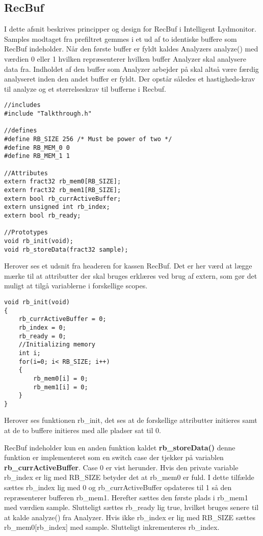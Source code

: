 \subsection{RecBuf}
I dette afsnit beskrives principper og design for RecBuf i Intelligent Lydmonitor.
Samples modtaget fra prefiltret gemmes i et ud af to identiske buffere som RecBuf indeholder. Når den første buffer er fyldt kaldes Analyzers analyze() med værdien 0 eller 1 hvilken repræsenterer hvilken buffer Analyzer skal analysere data fra. Indholdet af den buffer som Analyzer arbejder på skal altså være færdig analyseret inden den andet buffer er fyldt. Der opstår således et hastigheds-krav til analyze og et størrelseskrav til bufferne i Recbuf. 

\begin{verbatim}
//includes
#include "Talkthrough.h"

//defines
#define RB_SIZE 256 /* Must be power of two */
#define RB_MEM_0 0
#define RB_MEM_1 1

//Attributes
extern fract32 rb_mem0[RB_SIZE];
extern fract32 rb_mem1[RB_SIZE];
extern bool rb_currActiveBuffer;
extern unsigned int rb_index;
extern bool rb_ready;

//Prototypes
void rb_init(void);
void rb_storeData(fract32 sample);
\end{verbatim}

Herover ses et udsnit fra headeren for kassen RecBuf. Det er her værd at lægge mærke til at attributter der skal bruges erklæres ved brug af extern, som gør det muligt at tilgå variablerne i forskellige scopes. 

\begin{verbatim}
void rb_init(void)
{
	rb_currActiveBuffer = 0;
	rb_index = 0;
	rb_ready = 0;
	//Initializing memory
	int i;
	for(i=0; i< RB_SIZE; i++)
	{
		rb_mem0[i] = 0;
		rb_mem1[i] = 0;
	}
}
\end{verbatim}

Herover ses funktionen rb\_init, det ses at de forskellige attributter initieres samt at de to buffere initieres med alle pladser sat til 0.


RecBuf indeholder kun en anden funktion kaldet \textbf{rb\_storeData()} denne funktion er implementeret som en switch case der tjekker på variablen \textbf{rb\_currActiveBuffer}. Case 0 er vist herunder. 
Hvis den private variable rb\_index er lig med RB\_SIZE betyder det at rb\_mem0 er fuld. I dette tilfælde sættes rb\_index lig med 0 og rb\_currActiveBuffer opdateres til 1 så den repræsenterer bufferen rb\_mem1. Herefter sættes den første plads i rb\_mem1 med værdien sample. Slutteligt sættes rb\_ready lig true, hvilket bruges senere til at kalde analyze() fra Analyzer. Hvis ikke rb\_index er lig med RB\_SIZE sættes rb\_mem0[rb\_index] med sample. Slutteligt inkrementeres rb\_index. 

